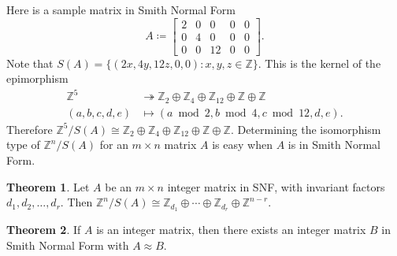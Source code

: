 \documentclass[12pt,a4paper,answers]{exam}
\newcommand{\Z}{\mathbb{Z}}
\theoremstyle{definition}
\newtheorem{theorem}{Theorem}[section]
\begin{document}
Here is a sample matrix in Smith Normal Form
\[ A \coloneqq
  \begin{bmatrix}
    2 & 0 & 0 & 0 & 0 \\
    0 & 4 & 0 & 0 & 0 \\
    0 & 0 & 12 & 0 & 0
  \end{bmatrix}.
\]
Note that $S(A)=\{(2x,4y,12z,0,0) : x,y,z\in\Z\}$. This is the kernel of the epimorphism
\begin{align*}
  \Z^5 &\twoheadrightarrow \Z_2\oplus\Z_4\oplus\Z_{12}\oplus\Z\oplus\Z \\
  (a,b,c,d,e) &\mapsto (a\bmod 2, b\bmod 4, c\bmod 12, d, e).
\end{align*}
Therefore $\Z^5/S(A)\cong\Z_2\oplus\Z_4\oplus\Z_{12}\oplus\Z\oplus\Z$. Determining the isomorphism type of $\Z^n/S(A)$ for an $m\times n$ matrix $A$ is easy when $A$ is in Smith Normal Form.

\begin{theorem}
  \label{decomposition}
  Let $A$ be an $m\times n$ integer matrix in SNF, with invariant factors $d_1,d_2,\ldots,d_r$. Then $\Z^n/S(A)\cong\Z_{d_1}\oplus\cdots\oplus\Z_{d_r}\oplus\Z^{n-r}$.
\end{theorem}

\begin{theorem}
  \label{SNF-existence}
  If $A$ is an integer matrix, then there exists an integer matrix $B$ in Smith Normal Form with $A\approx B$.
\end{theorem}
\end{document}
